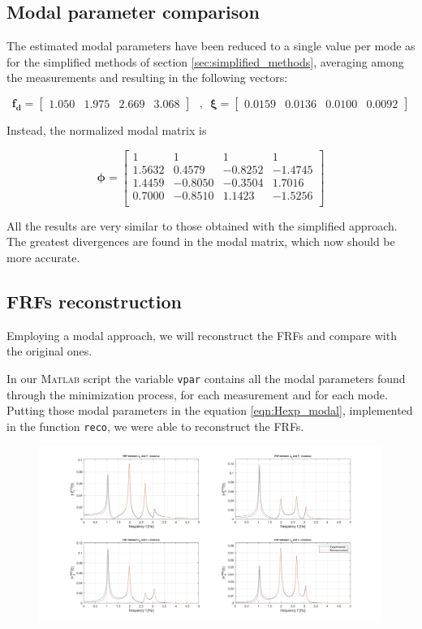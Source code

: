 \documentclass[a4paper,12pt,oneside]{article}
\begin{document}
\subsection{Modal parameter comparison}

The estimated modal parameters have been reduced to a single value per mode as for the simplified methods of section \ref{sec:simplified_methods}, averaging among the measurements and resulting in the following vectors:

\[
	\mathbf{f_d} =	\begin{bmatrix}
										1.050 & 1.975 & 2.669 & 3.068
									\end{bmatrix} \text{~ , ~}
		\bm{\xi} =	\begin{bmatrix}
									0.0159 & 0.0136 & 0.0100 & 0.0092
								\end{bmatrix}
\]

Instead, the normalized modal matrix is

\[
	\bm{\phi} =	\begin{bmatrix}
								1				& 1				& 1				& 1 \\
								1.5632	& 0.4579	& -0.8252	& -1.4745 \\
								1.4459	& -0.8050 & -0.3504	& 1.7016 \\
								0.7000	& -0.8510 & 1.1423	& -1.5256 \\
							\end{bmatrix}
\]

All the results are very similar to those obtained with the simplified approach. The greatest divergences are found in the modal matrix, which now should be more accurate.


\subsection{FRFs reconstruction}
Employing a modal approach, we will reconstruct the FRFs and compare with the original ones.

In our \textsc{Matlab} script the variable \texttt{vpar} contains all the modal parameters found through the minimization process, for each measurement and for each mode. Putting those modal parameters in the equation \ref{eqn:Hexp_modal}, implemented in the function \texttt{reco}, we were able to reconstruct the FRFs. 

\begin{figure}[H]
	\includegraphics[scale=0.3]{FRFrecoMOD}
\end{figure}
\end{document}
